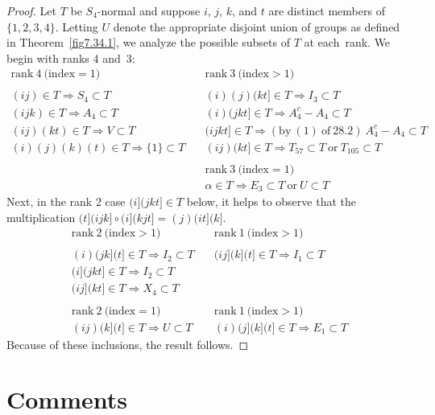 \documentclass{surv-l}
\numberwithin{equation}{section}
\numberwithin{table}{section}
\numberwithin{figure}{section}
\theoremstyle{definition}
\begin{document}
\begin{proof}Let $T$ be $S_{4}$-normal and suppose $i$, $j$, $k$, and $t$
are distinct members of $\{1,2,3,4\}$. Letting $U$ denote the
appropriate disjoint union of groups as defined in
Theorem~\ref{fig7.34.1}, we analyze the possible subsets of $T$ at
each~rank. We begin with ranks 4 and~3:
\[
\begin{array}{ll}
\mathrm{rank\ 4\ (index} =1) &\quad\mathrm{rank\ 3\ (index} >1) \\
 &\\
(ij)\in T\Rightarrow S_{4}\subset T &\quad(i) (j) (kt]\in
T\Rightarrow I_{3}\subset T \\
(ijk)\in T\Rightarrow A_{4}\subset T &\quad(i) (jkt]\in T\Rightarrow
A_{4}^{c}-A_{4}\subset T \\
(ij)(kt)\in T\Rightarrow V\subset T &\quad(ijkt] \in
T\Rightarrow \mathrm{(by\ (1)\ of\ 28.2)}\ A_{4}^{c}-A_{4}\subset T \\
(i)(j)(k)(t)\in T\Rightarrow\{1\}\subset T &\quad(ij)(kt]\in T\Rightarrow T_{57}\subset T\ \mathrm{or}\ T_{105}\subset T  \\
&\\
&\quad\mathrm{rank\ 3\ (index} =1) \\
&\quad\alpha\in T\Rightarrow E_{3}\subset T\ \mathrm{or}\ U\subset T
\end{array}
\]
Next, in the rank 2 case $(i](jkt]\in T$ below, it helps to
observe that the multiplication $(t](ijk]\circ (i](kjt]=(j) (it]
(k]$.
\[
\begin{array}{ll}
\mathrm{rank\ 2\ (index} >1) &\quad \mathrm{rank\ 1\ (index} >1) \\
 & \\
(i)(jk](t]\in T\Rightarrow I_{2}\subset T &\quad (ij](k](t]\in T\Rightarrow I_{1}\subset T \\
(i](jkt]\in T\Rightarrow I_{2}\subset T &  \\
(ij](kt]\in T\Rightarrow X_{4}\subset T & \\
&\\
\mathrm{rank\ 2\ (index} =1) &\quad\mathrm{rank\ 1\ (index} >1) \\
(ij)(k](t]\in T\Rightarrow U\subset T &\quad(i)(j](k](t]\in T\Rightarrow E_{1}\subset T
\end{array}
\]
Because of these inclusions, the result follows.
\end{proof}

\section{Comments}\label{sec7.35}
\end{document}
